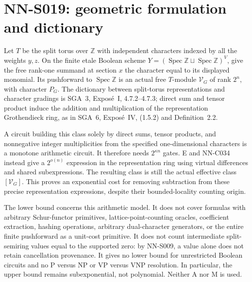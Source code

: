 \section{NN-S019: geometric formulation and dictionary}
\begin{geometricstatement}[NN-S019]
Let $T$ be the split torus over $\mathbb Z$ with independent
characters indexed by all the weights $y,z$. On the finite
etale Boolean scheme
$Y=(\operatorname{Spec}\mathbb Z\sqcup\operatorname{Spec}\mathbb Z)^V$,
give the free rank-one summand at section $x$ the character
equal to its displayed monomial. Its pushforward to
$\operatorname{Spec}\mathbb Z$ is an actual free $T$-module
$\mathcal V_G$ of rank $2^n$, with character $P_G$.
The dictionary between split-torus representations and
character gradings is SGA~3, Expos\'e~I,
4.7.2--4.7.3; direct sum and tensor product induce the
addition and multiplication of the representation
Grothendieck ring, as in SGA~6, Expos\'e~IV,
(1.5.2) and Definition~2.2.

A circuit building this class solely by direct sums,
tensor products, and nonnegative integer multiplicities
from the specified one-dimensional characters is a
monotone arithmetic circuit. It therefore needs
$2^{\kappa n}$ gates. E and NN-C034 instead give a
$2^{o(n)}$ expression in the representation ring using
virtual differences and shared subexpressions. The
resulting class is still the actual effective class
$[\mathcal V_G]$. This proves an exponential cost for
removing subtraction from these precise representation
expressions, despite their bounded-locality counting origin.

The lower bound concerns this arithmetic model. It does
not cover formulas with arbitrary Schur-functor primitives,
lattice-point-counting oracles, coefficient extraction,
hashing operations, arbitrary dual-character generators, or
the entire finite pushforward as a unit-cost primitive. It does not count intermediate
split-semiring values equal to the supported zero: by
NN-S009, a value alone does not retain cancellation
provenance. It gives no lower bound for unrestricted
Boolean circuits and no P versus NP or VP versus VNP
resolution. In particular, the upper bound remains
subexponential, not polynomial. Neither A nor M is used.


\end{geometricstatement}
